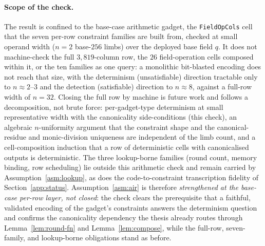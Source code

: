 \paragraph{Scope of the check.} The result is confined to the base-case
arithmetic gadget, the \texttt{FieldOpCols} cell that the seven per-row
constraint families are built from, checked at small operand width ($n=2$ base-$256$
limbs) over the deployed base field $q$. It does not machine-check the full
$3{,}819$-column row, the $26$ field-operation cells composed within it, or the
ten families as one query: a monolithic bit-blasted encoding does not reach that
size, with the determinism (unsatisfiable) direction tractable only to
$n\approx2$--$3$ and the detection (satisfiable) direction to $n\approx8$, against
a full-row width of $n=32$. Closing the full row by machine is future work and
follows a decomposition, not brute force: per-gadget-type determinism at small
representative width with the canonicality side-conditions (this check), an
algebraic $n$-uniformity argument that the constraint shape and the
canonical-residue and monic-division uniqueness are independent of the limb
count, and a cell-composition induction that a row of deterministic cells with
canonicalised outputs is deterministic. The three lookup-borne families (round
count, memory binding, row scheduling) lie outside this arithmetic check and
remain carried by Assumption~\ref{asm:lookup}, as does the code-to-constraint
transcription fidelity of Section~\ref{app:status}. Assumption~\ref{asm:air} is
therefore \emph{strengthened at the base-case per-row layer, not closed}: the
check clears the prerequisite that a faithful, validated encoding of the
gadget's constraints answers the determinism question and confirms the
canonicality dependency the thesis already routes through
Lemma~\ref{lem:round-fn} and Lemma~\ref{lem:compose}, while the full-row,
seven-family, and lookup-borne obligations stand as before.





